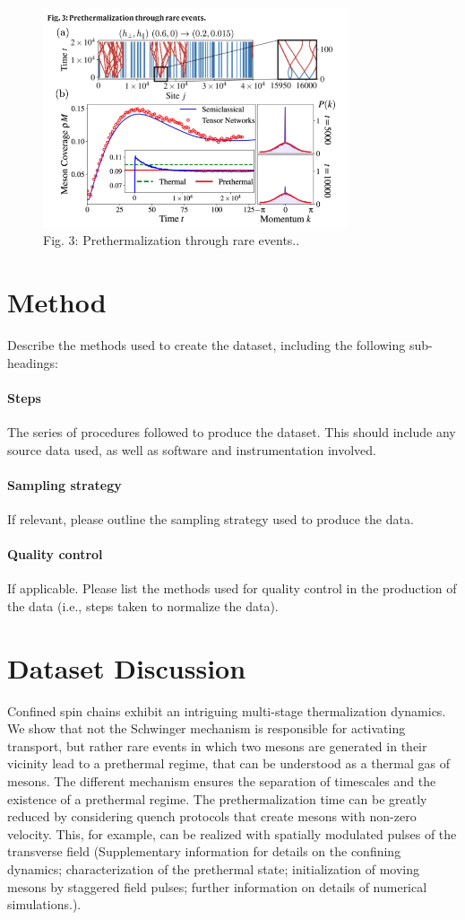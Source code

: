 \documentclass{article}
\begin{document}
\begin{figure}
\centering
\includegraphics[width=0.8\textwidth]{thirdimg}
\caption{\label{fig3}Fig. 3: Prethermalization through rare events..}
\end{figure}



\section{Method}
Describe the methods used to create the dataset, including the following sub-headings:
\paragraph{Steps} The series of procedures followed to produce the dataset. This should include any source data used, as well as software and instrumentation involved.
\paragraph{Sampling strategy} If relevant, please outline the sampling strategy used to produce the data.
\paragraph{Quality control} If applicable. Please list the methods used for quality control in the production of the data (i.e., steps taken to normalize the data).

\section{Dataset Discussion}
Confined spin chains exhibit an intriguing multi-stage thermalization dynamics. We show that not the Schwinger mechanism is responsible for activating transport, but rather rare events in which two mesons are generated in their vicinity lead to a prethermal regime, that can be understood as a thermal gas of mesons. The different mechanism ensures the separation of timescales and the existence of a prethermal regime. The prethermalization time can be greatly reduced by considering quench protocols that create mesons with non-zero velocity. This, for example, can be realized with spatially modulated pulses of the transverse field \cite{h} (Supplementary information for details on the confining dynamics; characterization of the prethermal state; initialization of moving mesons by staggered field pulses; further information on details of numerical simulations.).
\end{document}
